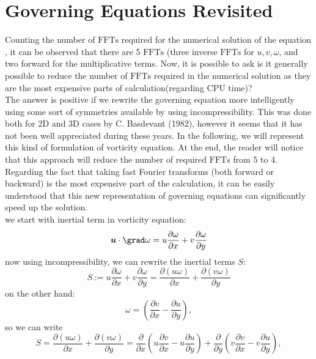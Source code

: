 \documentclass[12pt]{article}
\def\u{\bm{u}}
\begin{document}
\section{Governing Equations Revisited}
Counting the number of $\text{FFTs}$ required for the numerical solution of the equation , it can be observed that there are 5 $\text{FFTs}$ (three inverse $\text{FFTs}$ for $u,v,\omega$, and two forward for the multiplicative terms. Now, it is possible to ask is it generally possible to reduce the number of $\text{FFTs}$ required in the numerical solution as they are the most expensive parts of calculation(regarding CPU time)?\\
The answer is positive if we rewrite the governing equation more
intelligently using some sort of symmetries available by using
incompressibility. This was done both for 2D and 3D cases by C. Basdevant
(1982), however it seems that it has not been well appreciated during these
years. In the following, we will represent this kind of formulation of
vorticity equation. At the end, the reader will notice that this approach
will reduce the number of required $\text{FFTs}$ from 5 to 4. Regarding the
fact that taking fast Fourier transforms (both forward or backward) is the most expensive part of the calculation, it can be easily understood that this new representation of governing equations can significantly speed up the solution. \\
we start with inertial term in vorticity equation:
\begin{equation}\label{Eq-16}
\u\cdot\grad\omega=u\dfrac{\partial \omega}{\partial x}+v\dfrac{\partial \omega}{\partial y}
\end{equation}
now using incompressibility, we can rewrite the inertial terms $S$:
\begin{equation}\label{Eq-17}
S :=u\dfrac{\partial \omega}{\partial x}+v\dfrac{\partial \omega}{\partial y}=\dfrac{\partial (u\omega)}{\partial x}+\dfrac{\partial (v\omega)}{\partial y}
\end{equation}
on the other hand:
\begin{equation}\label{Eq-18}
\omega=\left(\dfrac{\partial v}{\partial x}-\dfrac{\partial u}{\partial y}\right),
\end{equation}
so we can write
\begin{equation}\label{Eq-19}
S =\dfrac{\partial (u\omega)}{\partial x}+\dfrac{\partial (v\omega)}{\partial y}=\dfrac{\partial}{\partial x} \left(u\dfrac{\partial v}{\partial x}-u\dfrac{\partial u}{\partial y}\right)+\dfrac{\partial}{\partial y} \left(v\dfrac{\partial v}{\partial x}-v\dfrac{\partial u}{\partial y}\right),
\end{equation}
\end{document}
